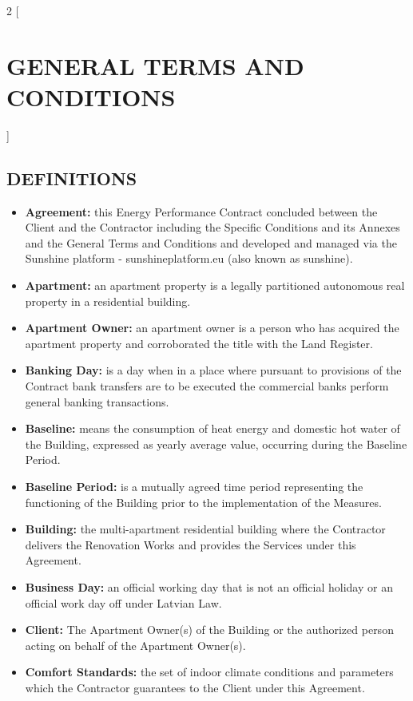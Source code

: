 \begin{multicols}{2}
[\section{GENERAL TERMS AND CONDITIONS}]

\subsection{DEFINITIONS}
\begin{itemize}[label={}]
  	\item\textbf{Agreement:} this Energy Performance Contract concluded between the Client and the Contractor including the Specific Conditions and its Annexes and the General Terms and Conditions and developed and managed via the Sunshine platform - sunshineplatform.eu (also known as sunshine).
	\item\textbf{Apartment:} an apartment property is a legally partitioned autonomous real property in a residential building.
	\item\textbf{Apartment Owner:} an apartment owner is a person who has acquired the apartment property and corroborated the title with the Land Register.
	\item\textbf{Banking Day:} is a day when in a place where pursuant to provisions of the Contract bank transfers are to be executed the commercial banks perform general banking transactions.
	\item\textbf{Baseline:} means the consumption of heat energy and domestic hot water of the Building, expressed as yearly average value, occurring during the Baseline Period.
	\item\textbf{Baseline Period:} is a mutually agreed time period representing the functioning of the Building prior to the implementation of the Measures.
	\item\textbf{Building:} the multi-apartment residential building where the Contractor delivers the Renovation Works and provides the Services under this Agreement.
	\item\textbf{Business Day:} an official working day that is not an official holiday or an official work day off under Latvian Law.
	\item\textbf{Client:} The Apartment Owner(s) of the Building or the authorized person acting on behalf of the Apartment Owner(s).
	\item\textbf{Comfort Standards:} the set of indoor climate conditions and parameters which the Contractor guarantees to the Client under this Agreement.

\end{itemize}
\end{multicols}
